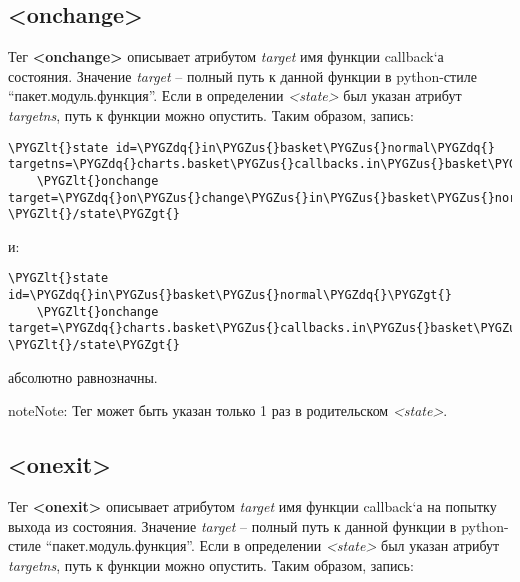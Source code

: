 \documentclass[letterpaper,10pt,english]{sphinxmanual}
\def\PYGZus{\char`\_}
\def\PYGZlt{\char`\<}
\def\PYGZgt{\char`\>}
\def\PYGZdq{\char`\"}
\begin{document}
\subsection{\textless{}onchange\textgreater{}}
\label{xml_format:onchange}
Тег \textbf{\textless{}onchange\textgreater{}} описывает атрибутом \emph{target} имя функции callback{}`а состояния. Значение \emph{target} – полный путь к данной функции в python-стиле ``пакет.модуль.функция''. Если в определении \emph{\textless{}state\textgreater{}} был указан атрибут \emph{targetns}, путь к функции можно опустить. Таким образом, запись:

\begin{Verbatim}[commandchars=\\\{\}]
\PYGZlt{}state id=\PYGZdq{}in\PYGZus{}basket\PYGZus{}normal\PYGZdq{} targetns=\PYGZdq{}charts.basket\PYGZus{}callbacks.in\PYGZus{}basket\PYGZus{}normal\PYGZdq{}\PYGZgt{}
    \PYGZlt{}onchange target=\PYGZdq{}on\PYGZus{}change\PYGZus{}in\PYGZus{}basket\PYGZus{}normal\PYGZdq{}/\PYGZgt{}
\PYGZlt{}/state\PYGZgt{}
\end{Verbatim}

и:

\begin{Verbatim}[commandchars=\\\{\}]
\PYGZlt{}state id=\PYGZdq{}in\PYGZus{}basket\PYGZus{}normal\PYGZdq{}\PYGZgt{}
    \PYGZlt{}onchange target=\PYGZdq{}charts.basket\PYGZus{}callbacks.in\PYGZus{}basket\PYGZus{}normal.on\PYGZus{}change\PYGZus{}in\PYGZus{}basket\PYGZus{}normal\PYGZdq{}/\PYGZgt{}
\PYGZlt{}/state\PYGZgt{}
\end{Verbatim}

абсолютно равнозначны.

\begin{notice}{note}{Note:}
Тег может быть указан только 1 раз в родительском \emph{\textless{}state\textgreater{}}.
\end{notice}


\subsection{\textless{}onexit\textgreater{}}
\label{xml_format:onexit}
Тег \textbf{\textless{}onexit\textgreater{}} описывает атрибутом \emph{target} имя функции callback{}`а на попытку выхода из состояния. Значение \emph{target} – полный путь к данной функции в python-стиле ``пакет.модуль.функция''. Если в определении \emph{\textless{}state\textgreater{}} был указан атрибут \emph{targetns}, путь к функции можно опустить. Таким образом, запись:
\end{document}
